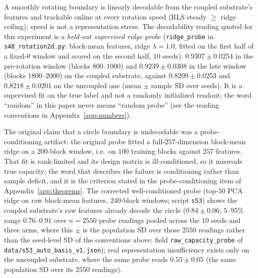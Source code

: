 \documentclass[preprint,12pt]{elsarticle}
\begin{document}
A smoothly rotating boundary is linearly decodable from the coupled
substrate's features and trackable online at every
rotation speed (RLS steady $\geq$ ridge ceiling); speed is not a
representation stress. The decodability reading quoted for this experiment is
a \emph{held-out supervised ridge probe} (\texttt{ridge\_probe} in
\texttt{s48\_rotation2d.py}: block-mean features, ridge $\lambda=1.0$, fitted
on the first half of a fixed-$\theta$ window and scored on the second half,
$10$ seeds): $0.9307\pm0.0254$ in the pre-rotation window (blocks
$800$--$1000$) and $0.9239\pm0.0308$ in the late window
(blocks $1800$--$2000$) on the coupled substrate, against
$0.8209\pm0.0253$ and $0.8218\pm0.0201$ on the uncoupled one (mean $\pm$ sample
SD over seeds). It is a supervised fit on the true label and not a randomly
initialized readout; the word ``random'' in this paper never means ``random
probe'' (see the reading conventions in Appendix~\ref{app:numbers}).

The original claim that a circle boundary is
undecodable was a probe-conditioning artifact: the original probe fitted a
full-$257$-dimension block-mean ridge on a $200$-block window, i.e.\ on
$100$ training blocks against $257$ features. That fit is rank-limited and
its design matrix is ill-conditioned, so it misreads true capacity; the word
that describes the failure is conditioning rather than sample deficit, and it
is the criterion stated in the probe-conditioning item of
Appendix~\ref{app:theorems}. The
corrected well-conditioned probe (top-$50$ PCA ridge on raw block-mean
features, $240$-block windows; script \texttt{s53}) shows the coupled
substrate's raw features already decode the circle
($0.84\pm0.06$; $5$--$95\%$ range $0.76$--$0.91$ over $n=2550$ probe readings
pooled across the $10$ seeds and three arms, where this $\pm$ is the population SD over those $2550$ readings rather than the seed-level SD of the conventions above; field
\texttt{raw\_capacity\_probe} of \texttt{data/s53\_auto\_basis\_v1.json}); real
representation insufficiency
exists only on the uncoupled substrate, where the same probe reads
$0.55\pm0.05$ (the same population SD over its $2550$ readings).
\end{document}
